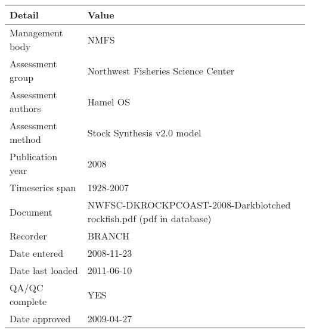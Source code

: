 \begin{table}[htb]
\centering
\begin{tabular}{lp{7cm}}
\toprule
Detail & Value \\
\midrule
Management body    & NMFS                                                                \\
Assessment group   & Northwest Fisheries Science Center                                  \\
Assessment authors & Hamel OS                                                            \\
Assessment method  & Stock Synthesis v2.0 model                                          \\
Publication year   & 2008                                                                \\
Timeseries span    & 1928-2007                                                           \\
Document           & NWFSC-DKROCKPCOAST-2008-Darkblotched rockfish.pdf (pdf in database) \\
Recorder           & BRANCH                                                              \\
Date entered       & 2008-11-23                                                          \\
Date last loaded   & 2011-06-10                                                          \\
QA/QC complete     & YES                                                                 \\
Date approved      & 2009-04-27                                                          \\
\bottomrule
\end{tabular}
\label{tab:assessdet}
\end{table}

